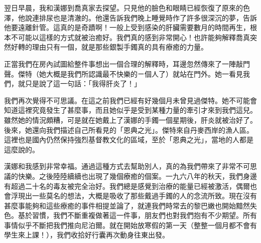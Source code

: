 翌日早晨，我和漢娜到喬真家去探望。只見他的臉色和眼睛已經恢復了原來的色澤，他說連排尿也是清澈的。他還告訴我們晚上睡覺時作了許多很深沉的夢，告訴他要遠離針管。這真的是奇蹟啊！一般上受到感染的肝臟需要數月的時間再生，根本不可能以這樣的方式就被治癒好。我們真的感到非常開心！也許能夠解釋喬真突然好轉的理由只有一個，就是那些銀製手鐲真的具有療癒的力量。

正當我們在房內試圖給整件事想出一個合理的解釋時，耳邊忽然傳來了一陣敲門聲。傑特（她大概是我們所認識最不快樂的ㄧ個人了）就站在門外。她一看見我們，就只是說了這一句話：「我得肝炎了！」

我們再次覺得不可思議。在這之前我們已經有好幾個月未曾見過傑特。她不可能會知道這裡究竟發生了甚麼事，而且她似乎是受到某種力量的牽引才來到我們這兒。雖然她的情況頗糟，可是就在她戴上了漢娜的手鐲一個星期後，肝炎就被治好了。後來，她還向我們描述自己所看見的「恩典之光」。傑特來自丹麥西岸的漁人區。這裡也是國內仍然保持強烈基督教文化的區域，至於「恩典之光」，當地的人都是這麼說的。

漢娜和我感到非常幸福。通過這種方式去幫助別人，真的為我們帶來了非常不可思議的快樂。之後陸陸續續也出現了幾個療癒的個案。一九六八年的秋天，我們身邊有超過二十名的毒友被完全治好。我們總是感覺到治療的能量已經被激活，偶爾也會浮現出一些莫名的想法，大概是吸收了那些戴過手鐲的人的念流所致。現在沒有甚麼事能夠和這些療癒的事件相提並論了，就連我們時常去的黎巴嫩也開始黯然失色。基於習慣，我們不斷重複做著這一件事，朋友們也對我們抱有不少期望。所有事情似乎不斷把我們推向尼泊爾。就在開始放寒假的第一天（整整一個月都不會有學生來上課！），我們收拾好行囊再次動身往東出發。
